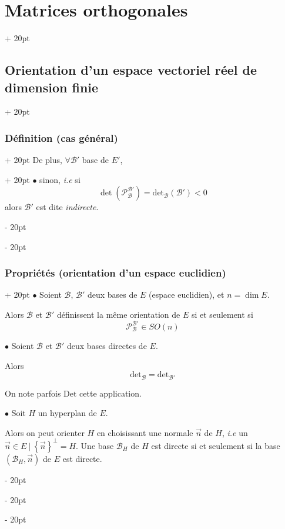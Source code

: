 \documentclass[a4paper, 12pt, twoside]{article}
\newcommand{\lr}[1]{\left( #1 \right)}
\newcommand{\set}[1]{\left\{ #1 \right\}}
\newcommand{\ind}[1][20pt]{\advance\leftskip + #1}
\newcommand{\deind}[1][20pt]{\advance\leftskip - #1}
\newenvironment{indt}[2][20pt]{#2 \par \ind[#1]}{\par \deind} %
\begin{document}
\begin{indt}{\section{Matrices orthogonales}}
\begin{indt}{\subsection{Orientation d'un espace vectoriel réel de dimension finie}}
\begin{indt}{\subsubsection{Définition (cas général)}}
\begin{indt}{De plus, $\forall \mathcal B'$ base de $E'$,}
                    $\bullet$ sinon, \textit{i.e} si
                    \[
                        \det\!\lr{\mathcal P_{\mathcal B}^{\mathcal B'}} = \mathrm{det}_{\mathcal B}(\mathcal B') < 0
                    \]
                    alors $\mathcal B'$ est dite \emph{indirecte}.
                \end{indt}
            \end{indt}

            \vspace{12pt}
            
            \begin{indt}{\subsubsection{Propriétés (orientation d'un espace euclidien)}}
                $\bullet$ Soient $\mathcal B$, $\mathcal B'$ deux bases de $E$ (espace euclidien), et $n = \dim E$.

                Alors $\mathcal B$ et $\mathcal B'$ définissent la même orientation de $E$ si et seulement si
                \[
                    \mathcal P_{\mathcal B}^{\mathcal B'} \in SO(n)
                \]

                \vspace{12pt}
                
                $\bullet$ Soient $\mathcal B$ et $\mathcal B'$ deux bases directes de $E$.

                Alors
                \[
                    \mathrm{det}_{\mathcal B} = \mathrm{det}_{\mathcal B'}
                \]

                On note parfois $\mathrm{Det}$ cette application.

                \vspace{12pt}
                
                $\bullet$ Soit $H$ un hyperplan de $E$.

                Alors on peut orienter $H$ en choisissant une normale $\vec n$ de $H$, \textit{i.e} un $\vec n \in E\ |\ \set{\vec n}^\perp = H$. Une base $\mathcal B_H$ de $H$ est directe si et seulement si la base $(\mathcal B_H, \vec n)$ de $E$ est directe. 
            \end{indt}
        \end{indt}

        \vspace{12pt}
        

\end{indt}
\end{document}

